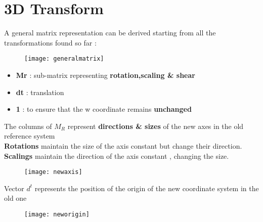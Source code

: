 \section{3D Transform}
A general matrix representation can be derived starting from all the transformations found so far :
\begin{figure}[H]
\centering
  \texttt{[image: generalmatrix]}
\end{figure}
\begin{itemize}
\item \textbf{Mr} : sub-matrix representing \textbf{rotation,scaling \& shear}
\item \textbf{dt} : translation
\item \textbf{1}  : to ensure that the w coordinate remains \textbf{unchanged}
\end{itemize}
The columns of $M_R$ represent \textbf{directions \& sizes} of the new axes in the old reference system\\
\textbf{Rotations} maintain the size of the axis constant but change their direction.\\
\textbf{Scalings} maintain the direction of the axis constant , changing the size.\\

\begin{figure}[H]
\centering
  \texttt{[image: newaxis]}
\end{figure}
Vector $d^t$ represents the position of the origin of the new coordinate system in the old one
\begin{figure}[H]
\centering
  \texttt{[image: neworigin]}
\end{figure}



